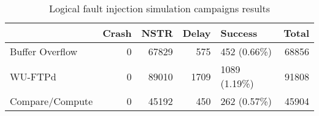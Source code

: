 \begin{table}[H]
\centering
\caption{Logical fault injection simulation campaigns results}
\label{table:end_sim_by_status_hamming_multi_bitflip_spatial}
\begin{tabular}{lrrrlr}
\toprule
 & Crash & NSTR & Delay & Success & Total \\
\midrule
Buffer Overflow & 0 & 67829 & 575 & 452 (0.66\%) & 68856 \\
WU-FTPd & 0 & 89010 & 1709 & 1089 (1.19\%) & 91808 \\
Compare/Compute & 0 & 45192 & 450 & 262 (0.57\%) & 45904 \\
\bottomrule
\end{tabular}
\end{table}
